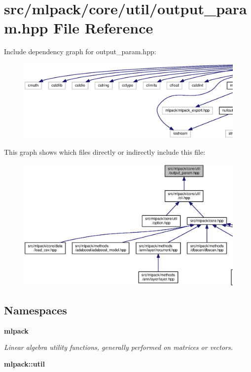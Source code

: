 \section{src/mlpack/core/util/output\+\_\+param.hpp File Reference}
\label{output__param_8hpp}
Include dependency graph for output\+\_\+param.\+hpp\+:
\nopagebreak
\begin{figure}[H]
\begin{center}
\leavevmode
\includegraphics[width=350pt]{output__param_8hpp__incl}
\end{center}
\end{figure}
This graph shows which files directly or indirectly include this file\+:
\nopagebreak
\begin{figure}[H]
\begin{center}
\leavevmode
\includegraphics[width=350pt]{output__param_8hpp__dep__incl}
\end{center}
\end{figure}
\subsection*{Namespaces}
\begin{DoxyCompactItemize}
\item 
 {\bf mlpack}
\begin{DoxyCompactList}\small\item\em Linear algebra utility functions, generally performed on matrices or vectors. \end{DoxyCompactList}\item 
 {\bf mlpack\+::util}
\end{DoxyCompactItemize}
